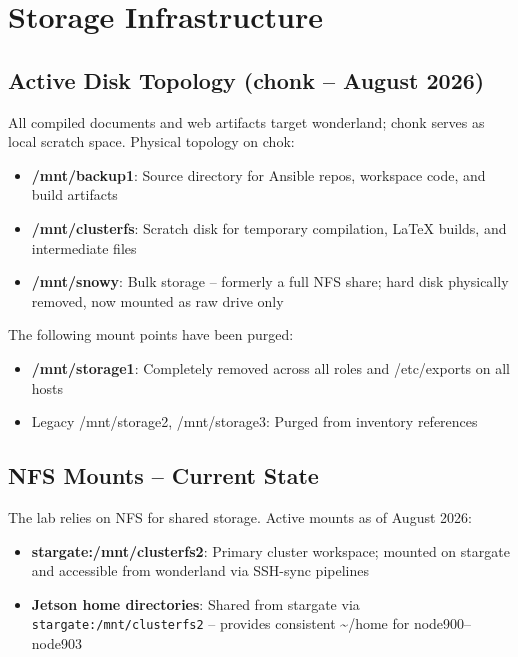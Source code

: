 \section{Storage Infrastructure}

\subsection{Active Disk Topology (chonk -- August 2026)}

All compiled documents and web artifacts target wonderland; chonk serves as local scratch space. Physical topology on chok:

\begin{itemize}
    \item \textbf{/mnt/backup1}: Source directory for Ansible repos, workspace code, and build artifacts
    
    \item \textbf{/mnt/clusterfs}: Scratch disk for temporary compilation, LaTeX builds, and intermediate files
    
    \item \textbf{/mnt/snowy}: Bulk storage -- formerly a full NFS share; hard disk physically removed, now mounted as raw drive only
\end{itemize}

The following mount points have been purged:
\begin{itemize}
    \item \textbf{/mnt/storage1}: Completely removed across all roles and /etc/exports on all hosts
    \item Legacy /mnt/storage2, /mnt/storage3: Purged from inventory references
\end{itemize}

\subsection{NFS Mounts -- Current State}

The lab relies on NFS for shared storage. Active mounts as of August 2026:

\begin{itemize}
    \item \textbf{stargate:/mnt/clusterfs2}: Primary cluster workspace; mounted on stargate and accessible from wonderland via SSH-sync pipelines
    
    \item \textbf{Jetson home directories}: Shared from stargate via \texttt{stargate:/mnt/clusterfs2} -- provides consistent \textasciitilde/home for node900--node903
\end{itemize}

